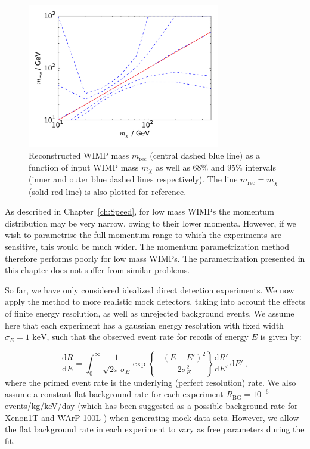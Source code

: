 \begin{figure}[t]
\centering
  \includegraphics[width=0.75\textwidth]{Poly/VaryingM.pdf}
  \caption[Reconstructed WIMP mass as a function of input WIMP mass for ideal experiments]{Reconstructed WIMP mass $m_\textrm{rec}$ (central dashed blue line) as a function of input WIMP mass $m_\chi$ as well as 68\% and 95\% intervals (inner and outer blue dashed lines respectively). The line $m_\textrm{rec} = m_\chi$ (solid red line) is also plotted for reference.}
  \label{fig:Poly:VaryingM}
\end{figure}

As described in Chapter~\ref{ch:Speed}, for low mass WIMPs the momentum distribution may be very narrow, owing to their lower momenta. However, if we wish to parametrise the full momentum range to which the experiments are sensitive, this would be much wider.  The momentum parametrization method therefore performs poorly for low mass WIMPs. The parametrization presented in this chapter does not suffer from similar problems.

So far, we have only considered idealized direct detection experiments. We now apply the method to more realistic mock detectors, taking into account the effects of finite energy resolution, as well as unrejected background events. We assume here that each experiment has a gaussian energy resolution with fixed width $\sigma_E = 1 \textrm{ keV}$, such that the observed event rate for recoils of energy $E$ is given by: 

\begin{equation}
\frac{\textrm{d}R}{\textrm{d}E} = \int_{0}^{\infty} \frac{1}{\sqrt{2 \pi} \sigma_E}\exp\left\{-\frac{(E-E')^2}{2\sigma_E^2}\right\} \frac{\textrm{d}{R'}}{\textrm{d}E'} \, \textrm{d}E'\,,
\end{equation}
where the primed event rate is the underlying (perfect resolution) rate. We also assume a constant flat background rate for each experiment $R_\textrm{BG} = 10^{-6}$ events/kg/keV/day (which has been suggested as a possible background rate for Xenon1T \cite{Aprile:2010} and WArP-100L \cite{Grandi:2005}) when generating mock data sets. However, we allow the flat background rate in each experiment to vary as free parameters during the fit.

